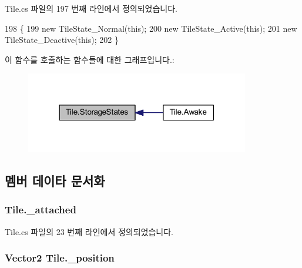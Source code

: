 Tile.\+cs 파일의 197 번째 라인에서 정의되었습니다.


\begin{DoxyCode}
198     \{
199         \textcolor{keyword}{new} TileState\_Normal(\textcolor{keyword}{this});
200         \textcolor{keyword}{new} TileState\_Active(\textcolor{keyword}{this});
201         \textcolor{keyword}{new} TileState\_Deactive(\textcolor{keyword}{this});
202     \}
\end{DoxyCode}


이 함수를 호출하는 함수들에 대한 그래프입니다.\+:\nopagebreak
\begin{figure}[H]
\begin{center}
\leavevmode
\includegraphics[width=277pt]{class_tile_a6cb69a9fad04bee1fa3473aec22428de_icgraph}
\end{center}
\end{figure}




\subsection{멤버 데이타 문서화}
\subsubsection[{\texorpdfstring{\+\_\+attached}{_attached}}]{ Tile.\+\_\+attached\hspace{0.3cm}{\ttfamily [private]}}\hypertarget{class_tile_aa548ae60732f4d054b6777436baefdd5}{}\label{class_tile_aa548ae60732f4d054b6777436baefdd5}


Tile.\+cs 파일의 23 번째 라인에서 정의되었습니다.

\subsubsection[{\texorpdfstring{\+\_\+position}{_position}}]{\setlength{\rightskip}{0pt plus 5cm}Vector2 Tile.\+\_\+position\hspace{0.3cm}{\ttfamily [private]}}\hypertarget{class_tile_a56d02616cede51da0afdceff82ca958d}{}\label{class_tile_a56d02616cede51da0afdceff82ca958d}


